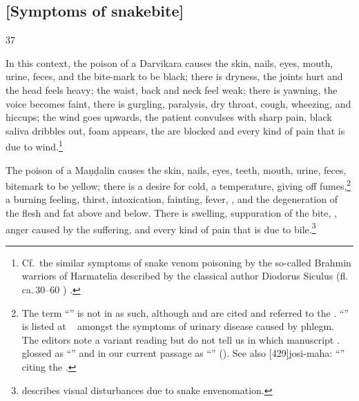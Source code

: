 \begin{translation}
\subsection{[Symptoms of snakebite]}

\item[37] 

In this context, the poison of a Darvīkara causes the skin, nails, eyes,
mouth, urine, feces, and the bite-mark to be black; there is dryness, the
joints hurt and the head feels heavy; the waist, back and neck feel weak;
there is yawning, the voice becomes faint, there is gurgling, paralysis,
dry throat, cough, wheezing, and hiccups; the wind goes upwards, the
patient convulses with sharp pain, black saliva dribbles out, foam
appears, the  are blocked and every kind of pain that
is due to wind.\footnote{Cf.\ the similar symptoms of snake venom
    poisoning by the so-called Brahmin warriors of Harmatelia described by
    the classical author Diodorus Siculus (fl.\,ca.\,30--60 \BCE)
    \citep[108]{egge-1975}.}


The poison of a Maṇḍalin causes the skin, nails, eyes, teeth, mouth,
urine, feces, bitemark  to be yellow; there is a desire for cold, a
temperature, giving off fumes,\footnote{The term
    “” is not in \cite[596]{moni-sans} as
    such, although  and  
    are
    cited and referred to the \SS. “” is
    listed at \SS\  amongst the symptoms of urinary disease
    caused by phlegm. The editors note a variant reading 
    but do not tell us in which manuscript \citep[291, n.\,3]{vulgate}.
     glossed  as
    “” and in our current passage as
    “” (\cite[573]{vulgate}).
    See also [429]{josi-maha}:  “” citing the \SS.} a burning feeling, thirst,
    intoxication, fainting, fever, , and the
    degeneration of the flesh and fat above and below. There is swelling,
    suppuration of the bite, , anger 
    caused by the suffering, and every kind of pain that is due to 
    bile.\footnote{\citet{ghos-2023} describes visual disturbances due to snake 
    envenomation.}


\end{translation}
